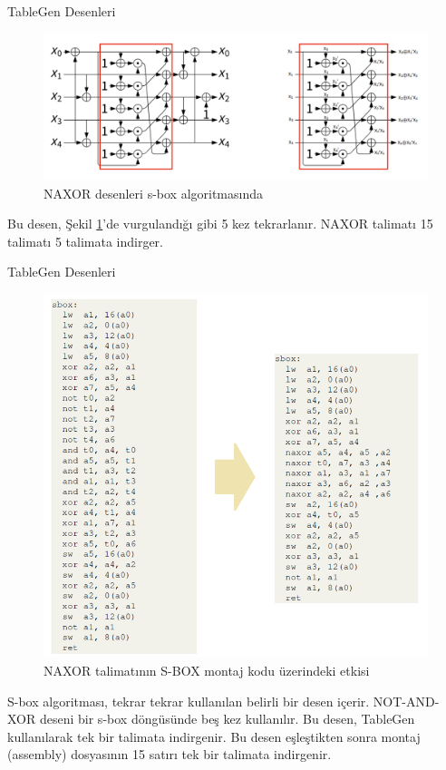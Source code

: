 \begin{frame}[fragile]{TableGen Desenleri}
\begin{figure}
    \centering
    \includegraphics[scale=0.15]{sbox_naxor_pattern.png}
    \caption{NAXOR desenleri s-box algoritmasında}
    \label{fig:sbox_naxor_pattern}
\end{figure}
Bu desen, Şekil \ref{fig:sbox_naxor_pattern}'de vurgulandığı gibi 5 kez tekrarlanır. NAXOR talimatı 15 talimatı 5 talimata indirger.
\end{frame}



\begin{frame}[fragile]{TableGen Desenleri}
\begin{figure}
    \centering
    \includegraphics[scale=0.27]{naxor_instruction.png}
    \caption{NAXOR talimatının S-BOX montaj kodu üzerindeki etkisi}
    \label{fig:sbox_instruction}
\end{figure}
S-box algoritması, tekrar tekrar kullanılan belirli bir desen içerir.
NOT-AND-XOR deseni bir s-box döngüsünde beş kez kullanılır. Bu desen, TableGen kullanılarak tek bir talimata indirgenir. Bu desen eşleştikten sonra montaj (assembly) dosyasının 15 satırı tek bir talimata indirgenir.
\end{frame}
